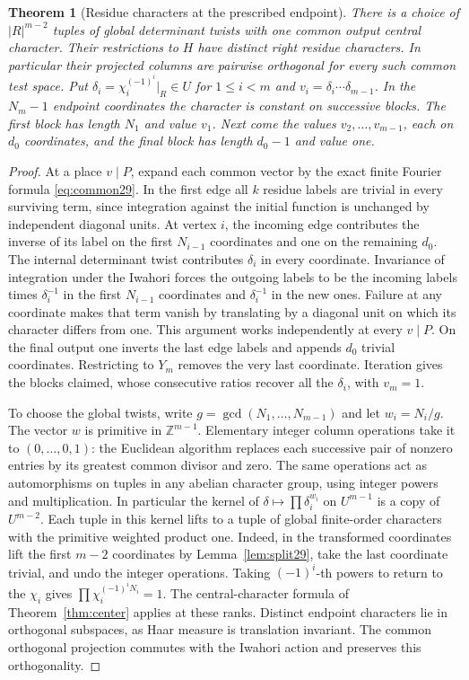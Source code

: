 \documentclass[a4paper,11pt]{article}
\newtheorem{theorem}[proposition]{Theorem}
\theoremstyle{definition}
\theoremstyle{remark}
\newcommand{\ZZ}{\mathbb Z}\newcommand{\ord}{\operatorname{ord}}
\numberwithin{equation}{section}
\begin{document}
\begin{theorem}[Residue characters at the prescribed endpoint]\label{thm:block47}
There is a choice of \(|R|^{m-2}\) tuples of global determinant twists
with one common output central character. Their restrictions to \(H\)
have distinct right residue characters. In particular their projected
columns are pairwise orthogonal for every such common test space.
Put \(\delta_i=\chi_i^{(-1)^i}|_R\in U\) for \(1\le i<m\) and
\(v_i=\delta_i\cdots\delta_{m-1}\).
In the \(N_m-1\) endpoint coordinates the character is constant on
successive blocks. The first block has length \(N_1\) and value \(v_1\).
Next come the values \(v_2,\ldots,v_{m-1}\), each on \(d_0\)
coordinates, and the final block has length \(d_0-1\) and value one.
\end{theorem}
\begin{proof}
At a place \(v\mid P\), expand each common vector by the exact finite
Fourier formula \eqref{eq:common29}. In the first edge all \(k\)
residue labels are trivial in every surviving term, since integration
against the initial function is unchanged by independent diagonal units.
At vertex \(i\), the incoming edge contributes the inverse of its
label on the first \(N_{i-1}\) coordinates and one on the remaining
\(d_0\). The internal determinant twist contributes \(\delta_i\) in
every coordinate. Invariance of integration under the Iwahori forces
the outgoing labels to be the incoming labels times \(\delta_i^{-1}\)
in the first \(N_{i-1}\) coordinates and \(\delta_i^{-1}\) in the new
ones. Failure at any coordinate makes that term vanish by translating
by a diagonal unit on which its character differs from one.
This argument works independently at every \(v\mid P\).
On the final output one inverts the last edge labels and appends \(d_0\)
trivial coordinates. Restricting to \(Y_m\) removes the very last
coordinate. Iteration gives the blocks claimed, whose consecutive ratios
recover all the \(\delta_i\), with \(v_m=1\).

To choose the global twists, write \(g=\gcd(N_1,\ldots,N_{m-1})\)
and let \(w_i=N_i/g\). The vector \(w\) is primitive in \(\ZZ^{m-1}\).
Elementary integer column operations take it to \((0,\ldots,0,1)\):
the Euclidean algorithm replaces each successive pair of nonzero
entries by its greatest common divisor and zero. The same operations
act as automorphisms on tuples in any abelian character group, using
integer powers and multiplication. In particular the kernel of
\(\delta\mapsto\prod\delta_i^{w_i}\) on \(U^{m-1}\) is a copy of
\(U^{m-2}\). Each tuple in this kernel lifts to a tuple of global
finite-order characters with the primitive weighted product one.
Indeed, in the transformed coordinates lift the first \(m-2\)
coordinates by Lemma~\ref{lem:split29}, take the last coordinate
trivial, and undo the integer operations. Taking \((-1)^i\)-th powers
to return to the \(\chi_i\) gives
\(\prod\chi_i^{(-1)^iN_i}=1\). The central-character formula of
Theorem~\ref{thm:center} applies at these ranks. Distinct endpoint
characters lie in orthogonal subspaces, as Haar measure is translation
invariant. The common orthogonal projection commutes with the Iwahori
action and preserves this orthogonality.
\end{proof}
\end{document}
